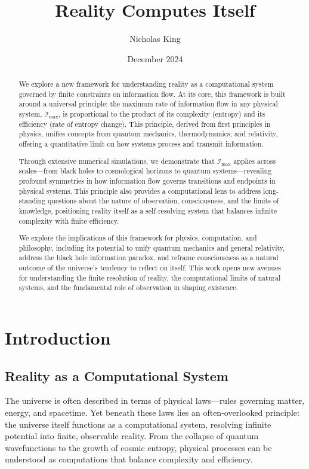 \documentclass[12pt]{article}
\title{Reality Computes Itself}
\author{Nicholas King}
\date{December 2024}
\begin{document}
\maketitle

\begin{abstract}
We explore a new framework for understanding reality as a computational system governed by finite constraints on information flow. At its core, this framework is built around a universal principle: the maximum rate of information flow in any physical system, $\mathcal{I}_{\text{max}}$, is proportional to the product of its complexity (entropy) and its efficiency (rate of entropy change). This principle, derived from first principles in physics, unifies concepts from quantum mechanics, thermodynamics, and relativity, offering a quantitative limit on how systems process and transmit information.

Through extensive numerical simulations, we demonstrate that $\mathcal{I}_{\text{max}}$ applies across scales—from black holes to cosmological horizons to quantum systems—revealing profound symmetries in how information flow governs transitions and endpoints in physical systems. This principle also provides a computational lens to address long-standing questions about the nature of observation, consciousness, and the limits of knowledge, positioning reality itself as a self-resolving system that balances infinite complexity with finite efficiency.

We explore the implications of this framework for physics, computation, and philosophy, including its potential to unify quantum mechanics and general relativity, address the black hole information paradox, and reframe consciousness as a natural outcome of the universe’s tendency to reflect on itself. This work opens new avenues for understanding the finite resolution of reality, the computational limits of natural systems, and the fundamental role of observation in shaping existence.
\end{abstract}


\section{Introduction}

\subsection{Reality as a Computational System}

The universe is often described in terms of physical laws—rules governing matter, energy, and spacetime. Yet beneath these laws lies an often-overlooked principle: the universe itself functions as a computational system, resolving infinite potential into finite, observable reality. From the collapse of quantum wavefunctions to the growth of cosmic entropy, physical processes can be understood as computations that balance complexity and efficiency.
\end{document}

